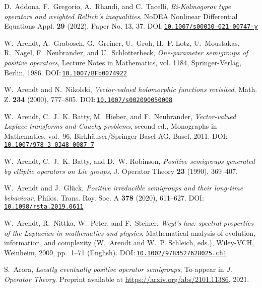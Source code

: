\documentclass[a4paper, reqno,titlepage]{amsart}
\numberwithin{equation}{section}
\theoremstyle{plain}
\theoremstyle{definition}
\theoremstyle{remark}
\begin{document}
\begin{thebibliography}{10}

D.~Addona, F.~Gregorio, A.~Rhandi, and C.~Tacelli, \emph{Bi-{K}olmogorov type
  operators and weighted {R}ellich's inequalities}, NoDEA Nonlinear
  Differential Equations Appl. \textbf{29} (2022), Paper No. 13, 37.
  DOI:\,\href{https://doi.org/10.1007/s00030-021-00747-y}{\nolinkurl{10.1007/s00030-021-00747-y}}

W.~Arendt, A.~Grabosch, G.~Greiner, U.~Groh, H.~P. Lotz, U.~Moustakas,
  R.~Nagel, F.~Neubrander, and U.~Schlotterbeck, \emph{One-parameter semigroups
  of positive operators}, Lecture Notes in Mathematics, vol. 1184,
  Springer-Verlag, Berlin, 1986.
  DOI:\,\href{https://doi.org/10.1007/BFb0074922}{\nolinkurl{10.1007/BFb0074922}}

W.~Arendt and N.~Nikolski, \emph{Vector-valued holomorphic functions
  revisited}, Math. Z. \textbf{234} (2000), 777--805.
  DOI:\,\href{https://doi.org/10.1007/s002090050008}{\nolinkurl{10.1007/s002090050008}}

W.~Arendt, C.~J.~K. Batty, M.~Hieber, and F.~Neubrander, \emph{Vector-valued
  {L}aplace transforms and {C}auchy problems}, second ed., Monographs in
  Mathematics, vol.~96, Birkh\"{a}user/Springer Basel AG, Basel, 2011.
  DOI:\,\href{https://doi.org/10.1007/978-3-0348-0087-7}{\nolinkurl{10.1007/978-3-0348-0087-7}}

W.~Arendt, C.~J.~K. Batty, and D.~W. Robinson, \emph{Positive semigroups
  generated by elliptic operators on {L}ie groups}, J. Operator Theory
  \textbf{23} (1990), 369--407.

W.~Arendt and J.~Gl\"{u}ck, \emph{Positive irreducible semigroups and their
  long-time behaviour}, Philos. Trans. Roy. Soc. A \textbf{378} (2020),
  611--627.
  DOI:\,\href{https://doi.org/10.1098/rsta.2019.0611}{\nolinkurl{10.1098/rsta.2019.0611}}

W.~Arendt, R.~Nittka, W.~Peter, and F.~Steiner, \emph{{Weyl's} law: spectral
  properties of the {L}aplacian in mathematics and physics}, Mathematical
  analysis of evolution, information, and complexity (W.~Arendt and W.~P.
  Schleich, eds.), Wiley-VCH, Weinheim, 2009, pp.~1--71 (English).
  DOI:\,\href{https://doi.org/10.1002/9783527628025.ch1}{\nolinkurl{10.1002/9783527628025.ch1}}

S.~Arora, \emph{Locally eventually positive operator semigroups}, To appear in
  \textit{J. Operator Theory}. Preprint available at
  \url{https://arxiv.org/abs/2101.11386}, 2021.


\end{thebibliography}
\end{document}
